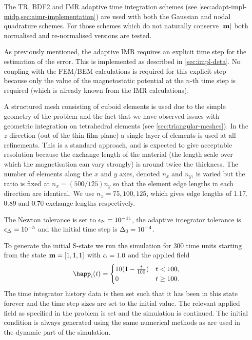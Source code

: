 The TR, BDF2 and IMR adaptive time integration schemes (see \cref{sec:adapt-impl-midp,sec:aimr-implementation}) are used with both the Gaussian and nodal quadrature schemes.
For those schemes which do not naturally conserve $\left|{\boldsymbol{\mathrm{m}}} \right|$ both normalised and re-normalised versions are tested.

As previously mentioned, the adaptive IMR requires an explicit time step for the estimation of the error.
This is implemented as described in \cref{sec:impl-deta}.
No coupling with the FEM/BEM calculations is required for this explicit step because only the value of the magnetostatic potential at the $n$-th time step is required (which is already known from the IMR calculations).

A structured mesh consisting of cuboid elements is used due to the simple geometry of the problem and the fact that we have observed issues with geometric integration on tetrahedral elements (see \cref{sec:triangular-meshes}).
In the $z$ direction (out of the thin film plane) a single layer of elements is used at all refinements.
This is a standard approach, and is expected to give acceptable resolution because the exchange length of the material (the length scale over which the magnetisation can vary strongly) is around twice the thickness.
The number of elements along the $x$ and $y$ axes, denoted $n_x$ and $n_y$, is varied but the ratio is fixed at $n_x = (500/125) n_y$ so that the element edge lengths in each direction are identical.
We use $n_x=75,100,125$, which gives edge lengths of 1.17, 0.89 and 0.70 exchange lengths respectively.

The Newton tolerance is set to $\epsilon_{\mathrm{N}} = 10^{-11}$, the adaptive integrator tolerance is $\epsilon_{\Delta_{}} = 10^{-5}$ and the initial time step is $\Delta_{0} = 10^{-4}$.


To generate the initial S-state we run the simulation for 300 time units starting from the state $\boldsymbol{\mathrm{m}}=[1,1,1]$ with $\alpha = 1.0$ and the applied field
\begin{equation}
  \happ_i(t) =
  \begin{cases}
    10 (1- \frac{t}{100}) & t < 100, \\
    0 & t \geq 100.
  \end{cases}
\end{equation}
The time integrator history data is then set such that it has been in this state forever and the time step sizes are set to the initial value.
The relevant applied field as specified in the problem is set and the simulation is continued.
The initial condition is always generated using the same numerical methods as are used in the dynamic part of the simulation.

